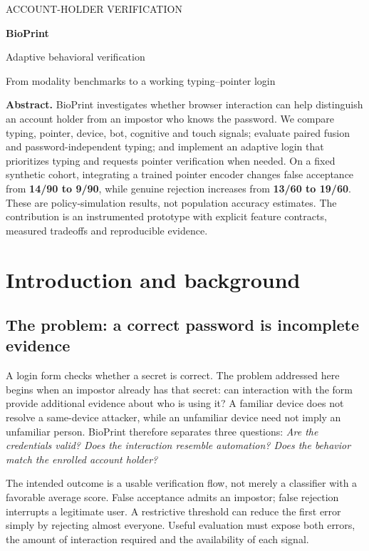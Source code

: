\documentclass[10pt,a4paper]{article}
\newcommand{\note}[1]{\begin{tcolorbox}[colback=pale,colframe=teal,boxrule=0pt,leftrule=2pt,arc=0pt,left=7pt,right=7pt,top=5pt,bottom=5pt]#1\end{tcolorbox}}
\begin{document}
\thispagestyle{fancy}
{\sffamily\color{teal}\small ACCOUNT-HOLDER VERIFICATION\par}
{\sffamily\bfseries\color{navy}\fontsize{28}{32}\selectfont BioPrint\par}
{\sffamily\color{navy}\Large Adaptive behavioral verification\par}
{\large From modality benchmarks to a working typing--pointer login\par}
\vspace{4pt}
\note{\textbf{Abstract.} BioPrint investigates whether browser interaction can help distinguish an account holder from an impostor who knows the password. We compare typing, pointer, device, bot, cognitive and touch signals; evaluate paired fusion and password-independent typing; and implement an adaptive login that prioritizes typing and requests pointer verification when needed. On a fixed synthetic cohort, integrating a trained pointer encoder changes false acceptance from \textbf{14/90 to 9/90}, while genuine rejection increases from \textbf{13/60 to 19/60}. These are policy-simulation results, not population accuracy estimates. The contribution is an instrumented prototype with explicit feature contracts, measured tradeoffs and reproducible evidence.}

\section{Introduction and background}
\subsection{The problem: a correct password is incomplete evidence}
A login form checks whether a secret is correct. The problem addressed here begins when an impostor already has that secret: can interaction with the form provide additional evidence about who is using it? A familiar device does not resolve a same-device attacker, while an unfamiliar device need not imply an unfamiliar person. BioPrint therefore separates three questions: \emph{Are the credentials valid? Does the interaction resemble automation? Does the behavior match the enrolled account holder?}

The intended outcome is a usable verification flow, not merely a classifier with a favorable average score. False acceptance admits an impostor; false rejection interrupts a legitimate user. A restrictive threshold can reduce the first error simply by rejecting almost everyone. Useful evaluation must expose both errors, the amount of interaction required and the availability of each signal.
\end{document}
